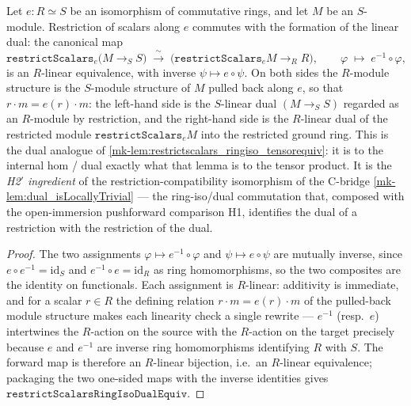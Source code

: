 \begin{lemma}\label{mk-lem:restrictscalars_ringiso_dualequiv}
  \leanok

  Let \(e : R \simeq S\) be an isomorphism of commutative rings, and let \(M\) be an
  \(S\)-module. Restriction of scalars along \(e\) commutes with the formation of the
  linear dual: the canonical map
  \[
    \mathtt{restrictScalars}_e\bigl(M \to_S S\bigr)
      \;\xrightarrow{\ \sim\ }\;
    \bigl(\mathtt{restrictScalars}_e M \to_R R\bigr),
    \qquad \varphi \;\longmapsto\; e^{-1} \circ \varphi,
  \]
  is an \(R\)-linear equivalence, with inverse \(\psi \mapsto e \circ \psi\). On both
  sides the \(R\)-module structure is the \(S\)-module structure of \(M\) pulled back
  along \(e\), so that \(r \cdot m = e(r) \cdot m\): the left-hand side is the
  \(S\)-linear dual \((M \to_S S)\) regarded as an \(R\)-module by restriction, and the
  right-hand side is the \(R\)-linear dual of the restricted module
  \(\mathtt{restrictScalars}_e M\) into the restricted ground ring. This is the dual
  analogue of \ref{mk-lem:restrictscalars_ringiso_tensorequiv}: it is to the internal hom
  / dual exactly what that lemma is to the tensor product. It is the \emph{H2$'$
  ingredient} of the restriction-compatibility isomorphism of the C-bridge
  \ref{mk-lem:dual_isLocallyTrivial} --- the ring-iso/dual commutation that, composed with
  the open-immersion pushforward comparison H1, identifies the dual of a restriction
  with the restriction of the dual.
\end{lemma}

\begin{proof}
  \leanok

The two assignments \(\varphi \mapsto e^{-1} \circ \varphi\) and
  \(\psi \mapsto e \circ \psi\) are mutually inverse, since \(e \circ e^{-1} =
  \mathrm{id}_S\) and \(e^{-1} \circ e = \mathrm{id}_R\) as ring homomorphisms, so the
  two composites are the identity on functionals. Each assignment is \(R\)-linear:
  additivity is immediate, and for a scalar \(r \in R\) the defining relation
  \(r \cdot m = e(r) \cdot m\) of the pulled-back module structure makes each linearity
  check a single rewrite --- \(e^{-1}\) (resp.\ \(e\)) intertwines the \(R\)-action on
  the source with the \(R\)-action on the target precisely because \(e\) and \(e^{-1}\)
  are inverse ring homomorphisms identifying \(R\) with \(S\). The forward map is
  therefore an \(R\)-linear bijection, i.e.\ an \(R\)-linear equivalence; packaging the
  two one-sided maps with the inverse identities gives
  \(\mathtt{restrictScalarsRingIsoDualEquiv}\).
\end{proof}

